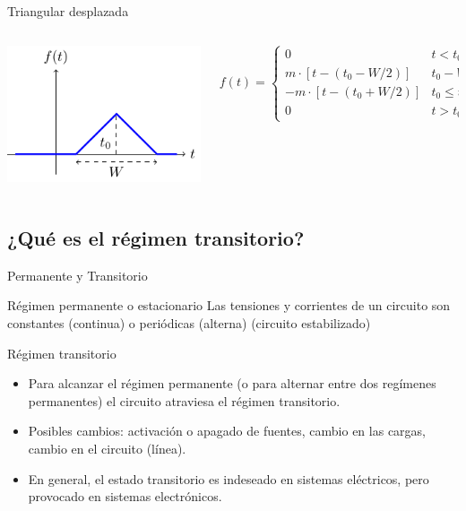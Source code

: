 \documentclass[aspectratio=169, usenames,svgnames,dvipsnames]{beamer}
\begin{document}
\begin{frame}[label={sec:org74b95de}]{Triangular desplazada}
\begin{columns}
\begin{column}{0.4\columnwidth}
\begin{center}
\includegraphics[width=.9\linewidth]{../figs/triangular_t0.pdf}
\end{center}
\end{column}

\begin{column}{0.6\columnwidth}
\[
  f(t) = %
  \begin{cases}
    0 & t < t_0 - W/2\\
    m \cdot [t - (t_0 -  W/2)]  & t_0 - W/2 \leq t \leq t_0\\
    -m \cdot [t - (t_0 + W/2)]  & t_0 \leq t \leq t_0 + W/2\\
    0  & t > t_0 + W/2
  \end{cases}
  \]
\end{column}
\end{columns}
\end{frame}

\subsection{¿Qué es el régimen transitorio?}
\label{sec:orgfc9f090}
\begin{frame}[label={sec:orgc15f701}]{Permanente y Transitorio}
\begin{block}{Régimen permanente o estacionario}
Las tensiones y corrientes de un circuito son constantes (continua) o periódicas (alterna) (circuito estabilizado)
\end{block}
\begin{block}{Régimen transitorio}
\begin{itemize}
\item Para alcanzar el régimen permanente (o para alternar entre dos regímenes permanentes) el circuito atraviesa el régimen transitorio.
\item Posibles cambios: activación o apagado de fuentes, cambio en las cargas, cambio en el circuito (línea).
\item En general, el estado transitorio es indeseado en sistemas eléctricos, pero provocado en sistemas electrónicos.
\end{itemize}
\end{block}
\end{frame}
\end{document}

